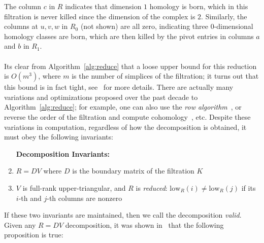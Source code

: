\documentclass{siamart190516}
\begin{document}
The column $c$ in $R$ indicates that dimension $1$ homology is born, which in this filtration is never killed since the dimension of the complex is $2$. Similarly, the columns at $u, v, w$ in $R_0$ (not shown) are all zero, indicating three $0$-dimensional homology classes  are born, which are then killed by the pivot entries in columns $a$ and $b$ in $R_1$.
\\
\\
\noindent
Its clear from Algorithm~\ref{alg:reduce} that a loose upper bound for this reduction is $O(m^3)$, where $m$ is the number of simplices of the filtration; it turns out that this bound is in fact tight, see~\cite{morozov2005persistence} for more details. 
There are actually many variations and optimizations proposed over the past decade to Algorithm~\ref{alg:reduce}; for example, one can also use the \emph{row algorithm}~\cite{de2011dualities}, or reverse the order of the filtration and compute cohomology~\cite{de2011dualities}, etc. Despite these variations in computation, regardless of how the decomposition is obtained, it must obey the following invariants:
  \vspace*{0.8em}
 \begin{enumerate}[leftmargin=2\parindent, align=left, labelsep=-5pt, topsep=0pt,itemsep=-0.25ex,parsep=1.2ex]
	\item[\hspace{-1.5em}\textbf{ Decomposition Invariants:}]
 	\item $R = D V$ where $D$ is the boundary matrix of the filtration $K$
 	\item $V$ is full-rank upper-triangular, and $R$ is \emph{reduced}: $\mathrm{low}_R(i) \neq \mathrm{low}_R(j)$ if its $i$-th and $j$-th columns are nonzero
 	\end{enumerate} 
 \vspace*{1em}
 If these two invariants are maintained, then we call the decomposition \emph{valid}. Given any $R = D V$ decomposition, it was shown in~\cite{zomorodian2005computing} that the following proposition is true:
\end{document}
